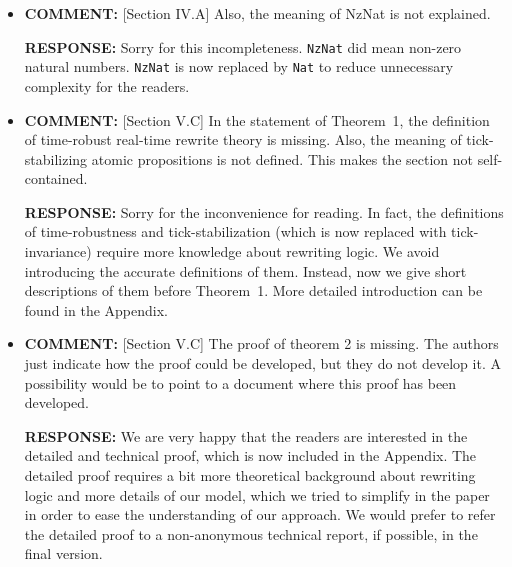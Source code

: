 \documentclass[10pt,journal]{IEEEtran}
\newcommand{\ANSWER}{{\bf RESPONSE: }}
\newcommand{\COMMENT}{{\bf COMMENT: }}
\begin{document}
\begin{itemize}
\item
\COMMENT [Section IV.A] Also, the meaning of NzNat is not explained.

\ANSWER Sorry for this incompleteness. \verb|NzNat| did mean non-zero
natural numbers. \verb|NzNat| is now replaced by \verb|Nat| to reduce
unnecessary complexity for the readers.

\item
\COMMENT [Section V.C] In the statement of Theorem~1, the definition
of time-robust real-time rewrite theory is missing. Also, the meaning
of tick-stabilizing atomic propositions is not defined. This makes the
section not self-contained.

\ANSWER Sorry for the inconvenience for reading. In fact, the
definitions of time-robustness and tick-stabilization (which is now
replaced with tick-invariance) require more knowledge about rewriting
logic. We avoid introducing the accurate definitions of them. Instead,
now we give short descriptions of them before Theorem~1. More detailed
introduction can be found in the Appendix.

\item
\COMMENT [Section V.C] The proof of theorem 2 is missing. The authors
just indicate how the proof could be developed, but they do not
develop it. A possibility would be to point to a document where this
proof has been developed.

\ANSWER We are very happy that the readers are interested in the
detailed and technical proof, which is now included in the Appendix.
The detailed proof requires a bit more theoretical background about
rewriting logic and more details of our model, which we tried to
simplify in the paper in order to ease the understanding of our
approach. We would prefer to refer the detailed proof to a
non-anonymous technical report, if possible, in the final version.
\end{itemize}
\end{document}
